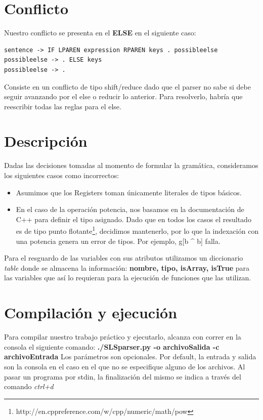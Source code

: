 \documentclass[10pt,a4paper]{article}
\begin{document}
\section{Conflicto}
Nuestro conflicto se presenta en el \textbf{ELSE} en el siguiente caso:

\begin{verbatim}
sentence -> IF LPAREN expression RPAREN keys . possibleelse
possibleelse -> . ELSE keys
possibleelse -> .
\end{verbatim}

Consiste en un conflicto de tipo shift/reduce dado que el parser no sabe si debe seguir avanzando por el else o reducir lo anterior. Para resolverlo, habría que reescribir todas las reglas para el else.

\section{Descripción}

Dadas las decisiones tomadas al momento de formular la gramática, consideramos los siguientes casos como incorrectos:

\begin{itemize}
\item Asumimos que los Registers toman únicamente literales de tipos básicos.
\item En el caso de la operación potencia, nos basamos en la documentación de C++ para definir el tipo asignado. Dado que en todos los casos el resultado es de tipo punto flotante\footnote{http://en.cppreference.com/w/cpp/numeric/math/pow}, decidimos mantenerlo, por lo que la indexación con una potencia genera un error de tipos. Por ejemplo, g[b ^ b] falla.
\end{itemize}

Para el resguardo de las variables con sus atributos utilizamos un diccionario \textit{table} donde se almacena la información: \textbf{nombre, tipo, isArray, isTrue} para las variables que así lo requieran para la ejecución de funciones que las utilizan.

\section{Compilación y ejecución}
Para compilar nuestro trabajo práctico y ejecutarlo, alcanza con correr en la consola el siguiente comando:
\textbf{./SLSparser.py -o archivoSalida -c archivoEntrada} 
Los parámetros son opcionales. Por default, la entrada y salida son la consola en el caso en el que no se especifique alguno de los archivos.
Al pasar un programa por stdin, la finalización del mismo se indica a través del comando \textit{ctrl+d}
\end{document}
